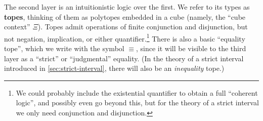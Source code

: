 \documentclass[12pt]{amsart}
\theoremstyle{plain}
\theoremstyle{definition}
\theoremstyle{remark}
\numberwithin{equation}{section}
\newcommand{\jdeq}{\equiv}
\newcommand{\types}{\vdash}
\newcommand{\tope}{\;\mathsf{tope}}
\begin{document}
The second layer is an intuitionistic logic over the first.
We refer to its types as \textbf{topes}, thinking of them as polytopes embedded in a cube (namely, the ``cube context'' $\Xi$).
Topes admit operations of finite conjunction and disjunction, but not negation, implication, or either quantifier.\footnote{We could probably include the existential quantifier to obtain a full ``coherent logic'', and possibly even go beyond this, but for the theory of a strict interval we only need conjunction and disjunction.}
There is also a basic ``equality tope'', which we write with the symbol $\jdeq$, since it will be visible to the third layer as a ``strict'' or ``judgmental'' equality.
(In the theory of a strict interval introduced in \cref{sec:strict-interval}, there will also be an \emph{inequality} tope.)

\begin{figure}
  \centering
\end{figure}
\end{document}
